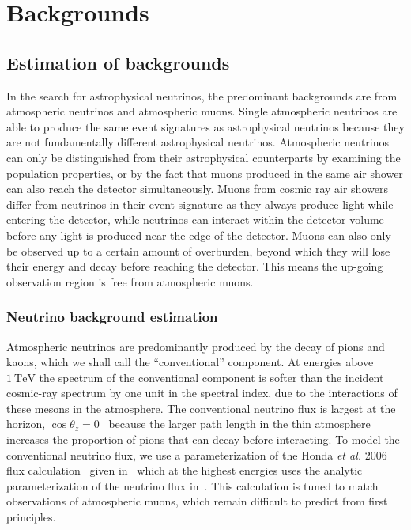 \chapter{Backgrounds}\label{chapter:backgrounds}

\section{Estimation of backgrounds}\label{sec:background_estimation}

In the search for astrophysical neutrinos, the predominant backgrounds are from atmospheric neutrinos and atmospheric muons.
Single atmospheric neutrinos are able to produce the same event signatures as astrophysical neutrinos because they are not fundamentally different astrophysical neutrinos.
Atmospheric neutrinos can only be distinguished from their astrophysical counterparts by examining the population properties, or by the fact that muons produced in the same air shower can also reach the detector simultaneously.
Muons from cosmic ray air showers differ from neutrinos in their event signature as they always produce light while entering the detector, while neutrinos can interact within the detector volume before any light is produced near the edge of the detector.
Muons can also only be observed up to a certain amount of overburden, beyond which they will lose their energy and decay before reaching the detector.
This means the up-going observation region is free from atmospheric muons.

\subsection{Neutrino background estimation}

Atmospheric neutrinos are predominantly produced by the decay of pions and kaons, which we shall call the ``conventional'' component.
At energies above $\SI{1}\TeV$ the spectrum of the conventional component is softer than the incident cosmic-ray spectrum by one unit in the spectral index, due to the interactions of these mesons in the atmosphere.
The conventional neutrino flux is largest at the horizon, $\cos\theta_z=0$~\cite{Gaisser:2002jj,Barr:2004br,Honda:2006qj,Petrova:2012qf} because the larger path length in the thin atmosphere increases the proportion of pions that can decay before interacting.
To model the conventional neutrino flux, we use a parameterization of the Honda {\it{}et al.} 2006 flux calculation~\cite{Honda:2006qj} given in~\cite{Montaruli:2011as} which at the highest energies uses the analytic parameterization of the neutrino flux in~\cite{Gaisser:2002jj}.
This calculation is tuned to match observations of atmospheric muons, which remain difficult to predict from first principles.

